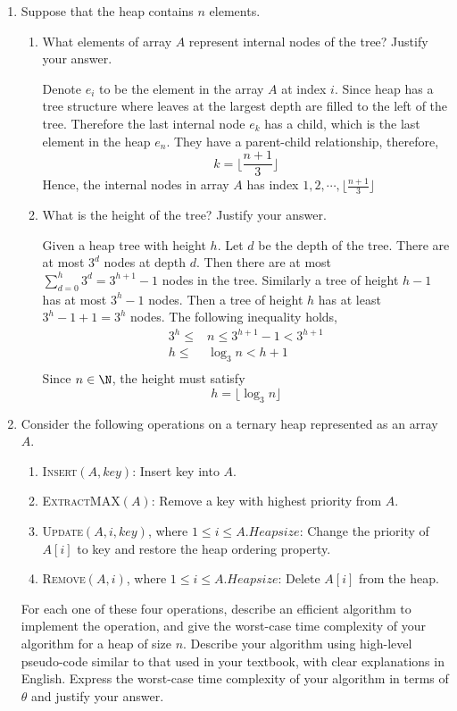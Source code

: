 \documentclass[11pt]{article}
\begin{document}
\begin{enumerate}
  \item Suppose that the heap contains $n$ elements.
  \begin{enumerate}
    \item What elements of array $A$ represent internal nodes of the tree? Justify your answer.
    \begin{solution}
      Denote $e_i$ to be the element in the array $A$ at index $i$. Since heap has a tree structure where leaves at the largest depth are filled to the left of the tree. Therefore the last internal node $e_{k}$ has a child, which is the last element in the heap $e_{n}$. They have a parent-child relationship, therefore,
      \[
        k = \lfloor \frac{n+1}{3} \rfloor
      \]
      Hence, the internal nodes in array $A$ has index $1, 2, \cdots, \lfloor \frac{n+1}{3} \rfloor$
    \end{solution}
    \item What is the height of the tree? Justify your answer.
    \begin{solution}
      Given a heap tree with height $h$. Let $d$ be the depth of the tree. There are at most $3^d$ nodes at depth $d$. Then there are at most $\sum_{d=0}^{h} 3^d = 3^{h+1} - 1$ nodes in the tree. Similarly a tree of height $h-1$ has at most $3^h - 1$ nodes. Then a tree of height $h$ has at least $3^h -1 + 1 = 3^h$ nodes. The following inequality holds,
      \begin{align*}
        3^h \leq & n \leq 3^{h+1} -1 < 3^{h+1}\\
        h \leq &\log_3 n < h+1\\
      \end{align*}
      Since $n\in\N$, the height must satisfy
      \[
        h = \lfloor \log_3 n \rfloor
      \]
    \end{solution}
  \end{enumerate}
  \item Consider the following operations on a ternary heap  represented as an array $A$.
  \begin{enumerate}
    \item \textsc{Insert}$(A, key)$: Insert key into $A$.
    \item \textsc{ExtractMAX}$(A)$: Remove a key with highest priority from $A$.
    \item \textsc{Update}$(A,i,key)$, where $1 \leq  i \leq A.Heapsize$: Change the priority of $A[i]$ to key and restore the heap ordering property.
    \item \textsc{Remove}$(A, i)$, where $1 \leq i \leq A.Heapsize$: Delete $A[i]$ from the heap.
  \end{enumerate}
  For each one of these four operations, describe an efficient algorithm to implement the operation, and give the worst-case time complexity of your algorithm for a heap of size $n$. Describe your algorithm using high-level pseudo-code similar to that used in your textbook, with clear explanations in English. Express the worst-case time complexity of your algorithm in terms of $\theta$ and justify your answer.



\end{enumerate}
\end{document}
